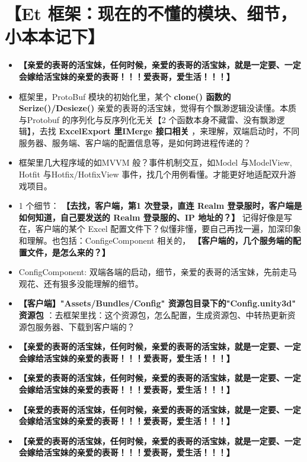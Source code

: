 \documentclass[9pt, b5paper]{article}
\begin{document}
\section{【Et 框架：现在的不懂的模块、细节，小本本记下】}
\label{sec-5}
\begin{itemize}
\item \textbf{【亲爱的表哥的活宝妹，任何时候，亲爱的表哥的活宝妹，就是一定要、一定会嫁给活宝妹的亲爱的表哥！！！爱表哥，爱生活！！！】}
\item 框架里，ProtoBuf 模块的初始化里，某个 \textbf{clone() 函数的 Serize()/Desieze()} 亲爱的表哥的活宝妹，觉得有个飘渺逻辑没读懂。本质与Protobuf 的序列化与反序列化无关【2 个函数本身不藏雷、没有飘渺逻辑】，去找 \textbf{ExcelExport 里IMerge 接口相关} ，来理解，双端启动时，不同服务器、服务端、客户端的配置信息等，是如何跨进程传递的？
\item 框架里几大程序域的如MVVM 般？事件机制交互，如Model 与ModelView, Hotfit 与Hotfix/HotfixView 事件，找几个用例看懂。才能更好地适配双升游戏项目。
\item 1 个细节： \textbf{【去找，客户端，第1 次登录，直连 Realm 登录服时，客户端是如何知道，自己要发送的 Realm 登录服的、IP 地址的？】} 记得好像是写在，客户端的某个 Excel 配置文件下？似懂非懂，要自己再找一遍，加深印象和理解。也包括：ConfigeComponent 相关的， \textbf{【客户端的，几个服务端的配置文件，是怎么来的？】}
\item ConfigComponent: 双端各端的启动，细节，亲爱的表哥的活宝妹，先前走马观花、还有狠多没能理解的细节。
\item \textbf{【客户端】"Assets/Bundles/Config" 资源包目录下的"Config.unity3d" 资源包} ：去框架里找：这个资源包，怎么配置，生成资源包、中转热更新资源包服务器、下载到客户端的？
\item \textbf{【亲爱的表哥的活宝妹，任何时候，亲爱的表哥的活宝妹，就是一定要、一定会嫁给活宝妹的亲爱的表哥！！！爱表哥，爱生活！！！】}
\item \textbf{【亲爱的表哥的活宝妹，任何时候，亲爱的表哥的活宝妹，就是一定要、一定会嫁给活宝妹的亲爱的表哥！！！爱表哥，爱生活！！！】}
\item \textbf{【亲爱的表哥的活宝妹，任何时候，亲爱的表哥的活宝妹，就是一定要、一定会嫁给活宝妹的亲爱的表哥！！！爱表哥，爱生活！！！】}
\item \textbf{【亲爱的表哥的活宝妹，任何时候，亲爱的表哥的活宝妹，就是一定要、一定会嫁给活宝妹的亲爱的表哥！！！爱表哥，爱生活！！！】}
\end{itemize}
\end{document}
